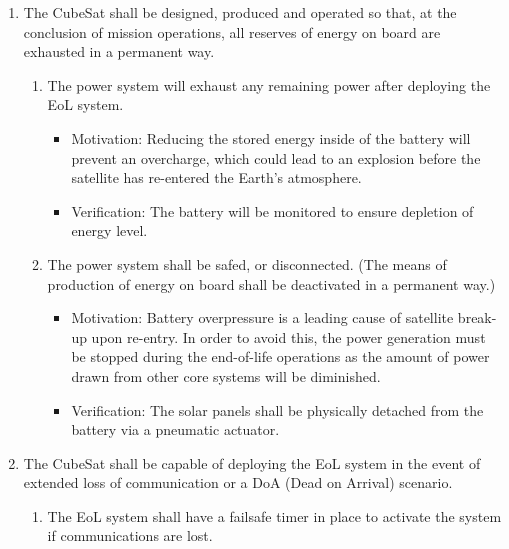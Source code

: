 \begin{enumerate}
\begin{enumerate}
\begin{enumerate}
\begin{itemize}
                    \item Verification: Literature review of the materials to ensure disintegration.
                \end{itemize}
        \end{enumerate}
        \item The CubeSat shall be designed, produced and operated so that, at the conclusion of mission operations, all reserves of energy on board are exhausted in a permanent way.
        \begin{enumerate}
            \item The power system will exhaust any remaining power after deploying the EoL system. 
                \begin{itemize}
                    \item Motivation: Reducing the stored energy inside of the battery will prevent an overcharge, which could lead to an explosion before the satellite has re-entered the Earth’s atmosphere.
                    \item Verification: The battery will be monitored to ensure depletion of energy level.
                \end{itemize}
            \item The power system shall be safed, or disconnected. (The means of production of energy on board shall be deactivated in a permanent way.) 
                \begin{itemize}
                    \item Motivation: Battery overpressure is a leading cause of satellite break-up upon re-entry. In order to avoid this, the power generation must be stopped during the end-of-life operations as the amount of power drawn from other core systems will be diminished.
                    \item Verification: The solar panels shall be physically detached from the battery via a pneumatic actuator. 
                \end{itemize}
             \end{enumerate} 
            \item The CubeSat shall be capable of deploying the EoL system in the event of extended loss of communication or a DoA (Dead on Arrival) scenario. 
            \begin{enumerate}
                \item The EoL system shall have a failsafe timer in place to activate the system if communications are lost. 
                \begin{itemize}

\end{itemize}
\end{enumerate}
\end{enumerate}
\end{enumerate}
